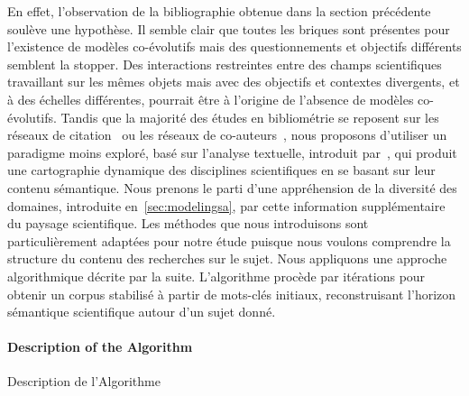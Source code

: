 {En effet, l'observation de la bibliographie obtenue dans la section précédente soulève une hypothèse. Il semble clair que toutes les briques sont présentes pour l'existence de modèles co-évolutifs mais des questionnements et objectifs différents semblent la stopper. Des interactions restreintes entre des champs scientifiques travaillant sur les mêmes objets mais avec des objectifs et contextes divergents, et à des échelles différentes, pourrait être à l'origine de l'absence de modèles co-évolutifs. Tandis que la majorité des études en bibliométrie se reposent sur les réseaux de citation~\cite{2013arXiv1310.8220N} ou les réseaux de co-auteurs~\cite{2014arXiv1402.7268S}, nous proposons d'utiliser un paradigme moins exploré, basé sur l'analyse textuelle, introduit par~\cite{chavalarias2013phylomemetic}, qui produit une cartographie dynamique des disciplines scientifiques en se basant sur leur contenu sémantique. Nous prenons le parti d'une appréhension de la diversité des domaines, introduite en~\ref{sec:modelingsa}, par cette information supplémentaire du paysage scientifique. Les méthodes que nous introduisons sont particulièrement adaptées pour notre étude puisque nous voulons comprendre la structure du contenu des recherches sur le sujet. Nous appliquons une approche algorithmique décrite par la suite. L'algorithme procède par itérations pour obtenir un corpus stabilisé à partir de mots-clés initiaux, reconstruisant l'horizon sémantique scientifique autour d'un sujet donné.
}


\paragraph{Description of the Algorithm}{Description de l'Algorithme}



